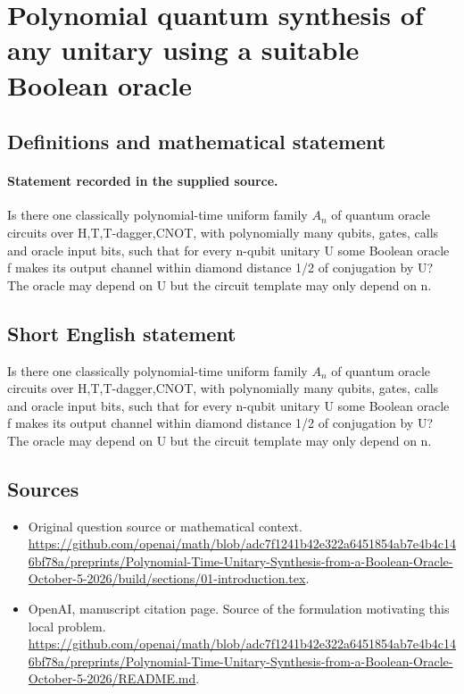 \documentclass[11pt]{article}
\begin{document}
\section*{Polynomial quantum synthesis of any unitary using a suitable Boolean oracle}\label{30007213}
\subsection{Definitions and mathematical statement}
\paragraph{Statement recorded in the supplied source.}
Is there one classically polynomial-time uniform family $A_n$ of quantum oracle circuits over H,T,T-dagger,CNOT, with polynomially many qubits, gates, calls and oracle input bits, such that for every n-qubit unitary U some Boolean oracle f makes its output channel within diamond distance 1/2 of conjugation by U? The oracle may depend on U but the circuit template may only depend on n.
\subsection{Short English statement}
Is there one classically polynomial-time uniform family $A_n$ of quantum oracle circuits over H,T,T-dagger,CNOT, with polynomially many qubits, gates, calls and oracle input bits, such that for every n-qubit unitary U some Boolean oracle f makes its output channel within diamond distance 1/2 of conjugation by U? The oracle may depend on U but the circuit template may only depend on n.
\subsection{Sources}
\begin{itemize}
\item[S1] Original question source or mathematical context.
\url{https://github.com/openai/math/blob/adc7f1241b42e322a6451854ab7e4b4c146bf78a/preprints/Polynomial-Time-Unitary-Synthesis-from-a-Boolean-Oracle-October-5-2026/build/sections/01-introduction.tex}.
\item[S2] OpenAI, manuscript citation page. Source of the formulation motivating this local problem.
\url{https://github.com/openai/math/blob/adc7f1241b42e322a6451854ab7e4b4c146bf78a/preprints/Polynomial-Time-Unitary-Synthesis-from-a-Boolean-Oracle-October-5-2026/README.md}.
\end{itemize}
\end{document}
